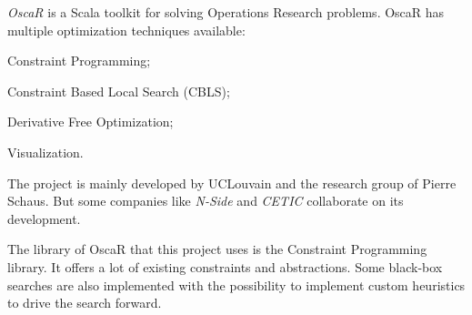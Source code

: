 \documentclass[../../thesis.tex]{subfiles}
\begin{document}
\emph{OscaR} \cite{oscar} is a Scala toolkit for solving Operations Research problems. 
OscaR has multiple optimization techniques available:
\begin{enumerate*}[label=(\roman*)]
  \item Constraint Programming;
  \item Constraint Based Local Search (CBLS);
  \item Derivative Free Optimization;
  \item Visualization.
\end{enumerate*}


The project is mainly developed by UCLouvain and the research group of Pierre Schaus. 
But some companies like \emph{N-Side} and \emph{CETIC} collaborate on its development.

The library of OscaR that this project uses is the Constraint Programming library. 
It offers a lot of existing constraints and abstractions. Some black-box searches are also 
implemented with the possibility to implement custom heuristics to drive the search forward.
\end{document}
